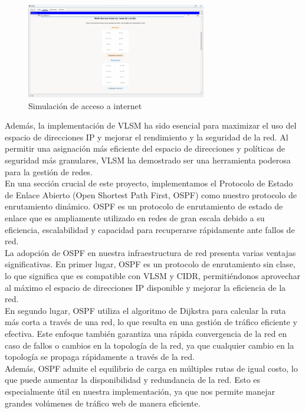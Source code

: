 \begin{figure}[H]
    \centering
    \includegraphics[width=0.7\textwidth]{Figures/4. Conclusions/internet_simulation.png}
    \caption{Simulación de acceso a internet}
    \label{fig: internet simulation}
\end{figure}

Además, la implementación de VLSM ha sido esencial para maximizar el uso del
espacio de direcciones IP y mejorar el rendimiento y la seguridad de la red. Al
permitir una asignación más eficiente del espacio de direcciones y políticas de
seguridad más granulares, VLSM ha demostrado ser una herramienta poderosa para
la gestión de redes.
\\

En una sección crucial de este proyecto, implementamos el Protocolo de Estado de
Enlace Abierto (Open Shortest Path First, OSPF) como nuestro protocolo de
enrutamiento dinámico. OSPF es un protocolo de enrutamiento de estado de enlace
que es ampliamente utilizado en redes de gran escala debido a su eficiencia,
escalabilidad y capacidad para recuperarse rápidamente ante fallos de red.
\\

La adopción de OSPF en nuestra infraestructura de red presenta varias ventajas
significativas. En primer lugar, OSPF es un protocolo de enrutamiento sin clase,
lo que significa que es compatible con VLSM y CIDR, permitiéndonos aprovechar
al máximo el espacio de direcciones IP disponible y mejorar la eficiencia de la
red.
\\

En segundo lugar, OSPF utiliza el algoritmo de Dijkstra para calcular la ruta
más corta a través de una red, lo que resulta en una gestión de tráfico
eficiente y efectiva. Este enfoque también garantiza una rápida convergencia de
la red en caso de fallos o cambios en la topología de la red, ya que cualquier
cambio en la topología se propaga rápidamente a través de la red.
\\

Además, OSPF admite el equilibrio de carga en múltiples rutas de igual costo, lo
que puede aumentar la disponibilidad y redundancia de la red. Esto es
especialmente útil en nuestra implementación, ya que nos permite manejar grandes
volúmenes de tráfico web de manera eficiente.
\\

